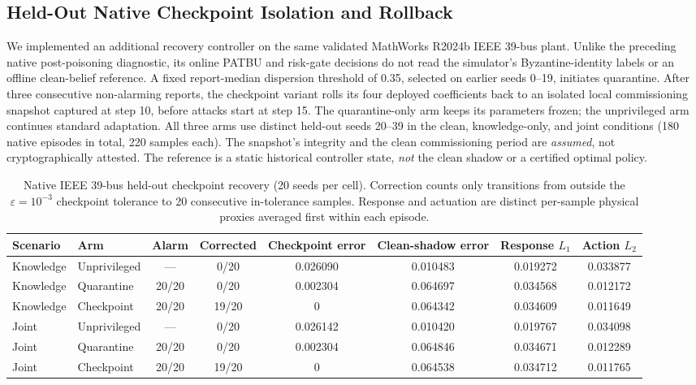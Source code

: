 \subsection{Held-Out Native Checkpoint Isolation and Rollback}
\label{subsec:native-checkpoint}
We implemented an additional recovery controller on the same validated MathWorks R2024b IEEE 39-bus plant. Unlike the preceding native post-poisoning diagnostic, its online PATBU and risk-gate decisions do not read the simulator's Byzantine-identity labels or an offline clean-belief reference. A fixed report-median dispersion threshold of 0.35, selected on earlier seeds 0--19, initiates quarantine. After three consecutive non-alarming reports, the checkpoint variant rolls its four deployed coefficients back to an isolated local commissioning snapshot captured at step 10, before attacks start at step 15. The quarantine-only arm keeps its parameters frozen; the unprivileged arm continues standard adaptation. All three arms use distinct held-out seeds 20--39 in the clean, knowledge-only, and joint conditions (180 native episodes in total, 220 samples each). The snapshot's integrity and the clean commissioning period are \emph{assumed}, not cryptographically attested. The reference is a static historical controller state, \emph{not} the clean shadow or a certified optimal policy.

\begin{table}[t]
\centering
\caption{Native IEEE 39-bus held-out checkpoint recovery (20 seeds per cell). Correction counts only transitions from outside the $\varepsilon=10^{-3}$ checkpoint tolerance to 20 consecutive in-tolerance samples. Response and actuation are distinct per-sample physical proxies averaged first within each episode.}
\label{tab:native-checkpoint}
\scriptsize
\setlength{\tabcolsep}{3pt}
\begin{tabular}{@{}llcccccc@{}}
\toprule
Scenario & Arm & Alarm & Corrected & Checkpoint error & Clean-shadow error & Response $L_1$ & Action $L_2$\\
\midrule
Knowledge & Unprivileged & --- & 0/20 & 0.026090 & 0.010483 & 0.019272 & 0.033877\\
Knowledge & Quarantine & 20/20 & 0/20 & 0.002304 & 0.064697 & 0.034568 & 0.012172\\
Knowledge & Checkpoint & 20/20 & 19/20 & 0 & 0.064342 & 0.034609 & 0.011649\\
Joint & Unprivileged & --- & 0/20 & 0.026142 & 0.010420 & 0.019767 & 0.034098\\
Joint & Quarantine & 20/20 & 0/20 & 0.002304 & 0.064846 & 0.034671 & 0.012289\\
Joint & Checkpoint & 20/20 & 19/20 & 0 & 0.064538 & 0.034712 & 0.011765\\
\bottomrule
\end{tabular}
\end{table}

